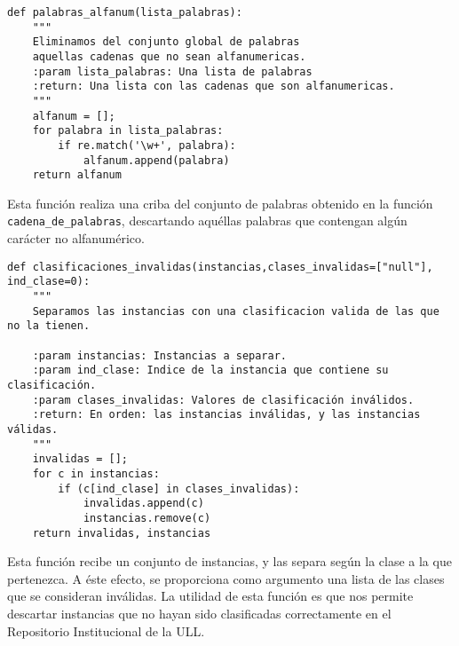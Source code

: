 \begin{center}
\begin{minipage}{\linewidth}
\begin{lstlisting}[caption=Función que retorna palabras alfanuméricas]
def palabras_alfanum(lista_palabras):
    """
    Eliminamos del conjunto global de palabras
    aquellas cadenas que no sean alfanumericas.
    :param lista_palabras: Una lista de palabras
    :return: Una lista con las cadenas que son alfanumericas.
    """
    alfanum = [];
    for palabra in lista_palabras:
        if re.match('\w+', palabra):
            alfanum.append(palabra)
    return alfanum
\end{lstlisting}
\end{minipage}
\end{center}

Esta función realiza una criba del conjunto de palabras obtenido en la función \texttt{cadena\_de\_palabras}, descartando aquéllas palabras que contengan algún carácter no alfanumérico.

\begin{center}
\begin{minipage}{\linewidth}
\begin{lstlisting}[caption=Función que separa las instancias con clasificación inválida.]
def clasificaciones_invalidas(instancias,clases_invalidas=["null"], ind_clase=0):
    """
    Separamos las instancias con una clasificacion valida de las que no la tienen.

    :param instancias: Instancias a separar.
    :param ind_clase: Indice de la instancia que contiene su clasificación.
    :param clases_invalidas: Valores de clasificación inválidos.
    :return: En orden: las instancias inválidas, y las instancias válidas.
    """
    invalidas = [];
    for c in instancias:
        if (c[ind_clase] in clases_invalidas):
            invalidas.append(c)
            instancias.remove(c)
    return invalidas, instancias
\end{lstlisting}
\end{minipage}
\end{center}

Esta función recibe un conjunto de instancias, y las separa según la clase a la que pertenezca. A éste efecto, se proporciona como argumento una lista de las clases que se consideran inválidas.
%
La utilidad de esta función es que nos permite descartar instancias que no hayan sido clasificadas correctamente en el Repositorio Institucional de la ULL.

